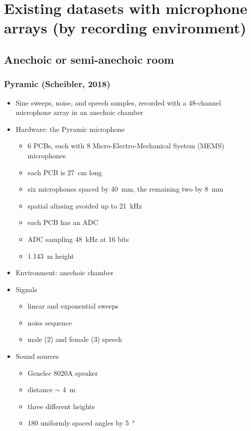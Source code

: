 \documentclass[14pt, oneside]{extarticle}
\begin{document}
\section{Existing datasets with microphone arrays (by recording environment)}

\subsection{Anechoic or semi-anechoic room}

\subsubsection{Pyramic (Scheibler, 2018)}

\begin{itemize}

\item Sine sweeps, noise, and speech samples, recorded with a 48-channel microphone array in an anechoic chamber \cite{scheibler2018pyramic}

\item Hardware: the Pyramic microphone \cite{scheibler2018pyramic}
	\begin{itemize}
	\item 6 PCBs, each with 8 Micro-Electro-Mechanical System (MEMS) microphones 
	\item each PCB is \SI{27}{\centi\metre} long
	\item six microphones spaced by \SI{40}{\milli\metre}, the remaining two by \SI{8}{\milli\metre}
	\item spatial aliasing avoided up to \SI{21}{\kilo\hertz}
	\item each PCB has an ADC
	\item ADC sampling \SI{48}{\kilo\hertz} at 16 bits
	\item \SI{1.143}{\metre} height
	\end{itemize}

\item Environment: anechoic chamber
	
\item Signals
	\begin{itemize}
	\item linear and exponential sweeps
	\item noise sequence
	\item male (2) and female (3) speech
	\end{itemize}

\item Sound sources
	\begin{itemize}
	\item Genelec 8020A speaker
	\item distance $\sim$ \SI{4}{\metre}
	\item three different heights
	\item 180 uniformly spaced angles by \SI{5}{\degree}
	\end{itemize}


\end{itemize}
\end{document}
